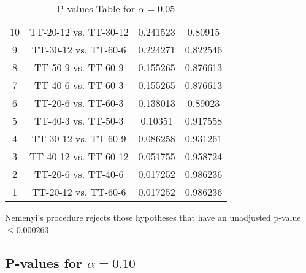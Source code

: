 \documentclass[a4paper,10pt]{article}
\begin{document}
\begin{landscape}
\begin{table}[!htp]
\begin{tabular}{cccc}
10&TT-20-12 vs. TT-30-12&0.241523&0.80915\\
9&TT-30-12 vs. TT-60-6&0.224271&0.822546\\
8&TT-50-9 vs. TT-60-9&0.155265&0.876613\\
7&TT-40-6 vs. TT-60-3&0.155265&0.876613\\
6&TT-20-6 vs. TT-60-3&0.138013&0.89023\\
5&TT-40-3 vs. TT-50-3&0.10351&0.917558\\
4&TT-30-12 vs. TT-60-9&0.086258&0.931261\\
3&TT-40-12 vs. TT-60-12&0.051755&0.958724\\
2&TT-20-6 vs. TT-40-6&0.017252&0.986236\\
1&TT-20-12 vs. TT-60-6&0.017252&0.986236\\
\hline
\end{tabular}
\caption{P-values Table for $\alpha=0.05$}
\end{table}Nemenyi's procedure rejects those hypotheses that have an unadjusted p-value $\le0.000263$.

\pagebreak

\subsection{P-values for $\alpha=0.10$}


\end{landscape}
\end{document}
